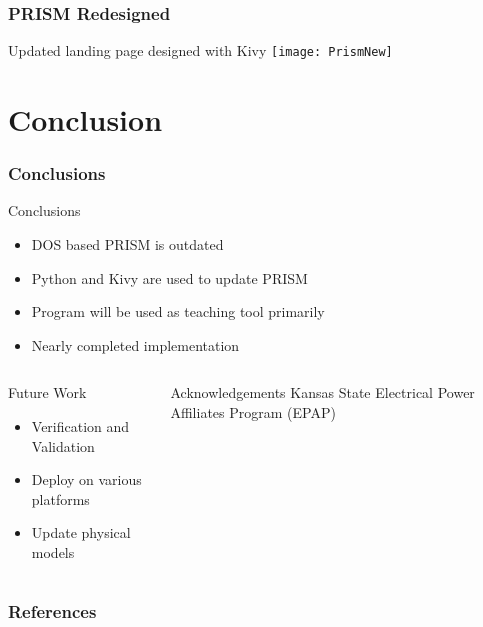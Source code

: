 \documentclass[fleqn]{beamer}
\begin{document}
    \begin{frame}
        \frametitle{PRISM Redesigned}
        \begin{center}
            Updated landing page designed with Kivy
            \texttt{[image: PrismNew]}
        \end{center}
    \end{frame}
    
    \section{Conclusion}
    \begin{frame}
        \frametitle{Conclusions}
        \begin{block}{Conclusions}
            \begin{itemize}
                \item DOS based PRISM is outdated
                \item Python and Kivy are used to update PRISM
                \item Program will be used as teaching tool primarily
                \item Nearly completed implementation
            \end{itemize}
        \end{block}
        \begin{columns}[T]
            \begin{column}{0.5\textwidth}
                \begin{block}{Future Work}
                    \begin{itemize}
                        \item Verification and Validation
                        \item Deploy on various platforms
                        \item Update physical models
                    \end{itemize}
                \end{block}
            \end{column}
            \begin{column}{0.5\textwidth}
                \begin{block}{Acknowledgements}
                    Kansas State Electrical Power Affiliates Program (EPAP)
                \end{block}
            \end{column}
        \end{columns}
        \nocite{*}
    \end{frame}
    
    \begin{frame}[t,allowframebreaks]\label{lastframe}
        \frametitle{References}
        
        
    \end{frame}
    
    
    
    
\end{document}
